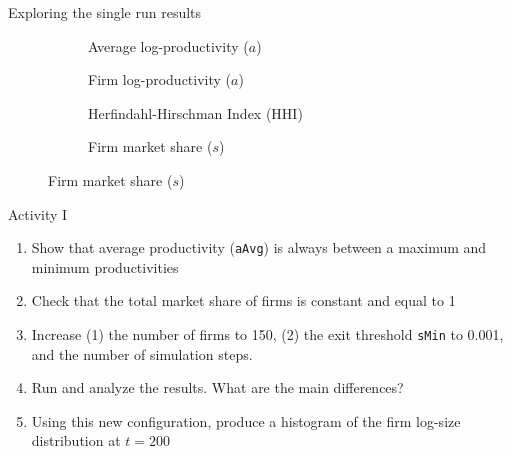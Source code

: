 \documentclass[bigger,aspectratio=169]{beamer}
\begin{document}
\begin{frame}[label={sec:org0bf069e}]{Exploring the single run results}
\begin{figure}[ht]
    \begin{subfigure}{0.48\textwidth}
        \centering
        
        \caption{Average log-productivity ($a$)}
        \label{fig:avg_prod}
    \end{subfigure}
    \hfill
    \begin{subfigure}{0.48\textwidth}
        \centering
        
        \caption{Firm log-productivity ($a$)}
        \label{fig:firm_prod}
    \end{subfigure}

    \begin{subfigure}{0.48\textwidth}
        \centering
        
        \caption{Herfindahl-Hirschman Index (HHI)}
        \label{fig:hhi}
    \end{subfigure}
    \hfill
    \begin{subfigure}{0.48\textwidth}
        \centering
        
        \caption{Firm market share ($s$)}
        \label{fig:market_share}
    \end{subfigure}
    \label{single-run-industry}
\end{figure}
\end{frame}
\begin{frame}[label={sec:org36b50c6},fragile]{Activity I}
 \begin{enumerate}
\item Show that average productivity (\texttt{aAvg}) is always between a maximum and minimum productivities
\item Check that the total market share of firms is constant and equal to 1
\item Increase (1) the number of firms to 150, (2) the exit threshold \texttt{sMin} to 0.001, and the number of simulation steps.
\item Run and analyze the results. What are the main differences?
\item Using this new configuration, produce a \alert{histogram} of the firm log-size distribution at \(t = 200\)
\end{enumerate}
\end{frame}
\end{document}
